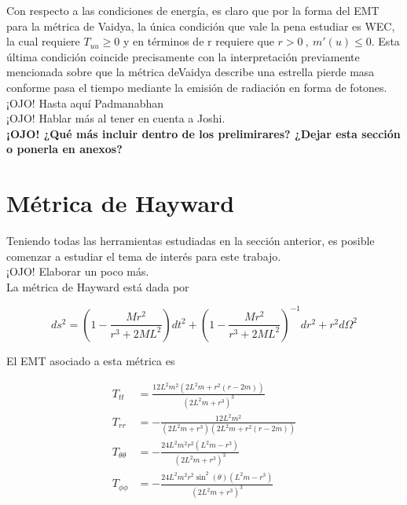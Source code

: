 \documentclass[prb,aps,preprintnumbers,amsmath,amssymb]{article}
\numberwithin{equation}{section}
\begin{document}
Con respecto a las condiciones de energía, es claro que por la forma del EMT para la métrica de Vaidya, la única condición que vale la pena estudiar es WEC, la cual requiere $T_{uu} \geq 0$ y en términos de r requiere que $r > 0\ ,\ m'(u)\leq 0 $. Esta última condición coincide precisamente con la interpretación previamente mencionada sobre que la métrica deVaidya describe una estrella pierde masa conforme pasa el tiempo mediante la emisión de radiación en forma de fotones.\\

¡OJO! Hasta aquí Padmanabhan\\

¡OJO! Hablar más al tener en cuenta a Joshi.\\

\textbf{¡OJO! ¿Qué más incluir dentro de los prelimirares? ¿Dejar esta sección o ponerla en anexos?}\\

\section{Métrica de Hayward}

Teniendo todas las herramientas estudiadas en la sección anterior, es posible comenzar a estudiar el tema de interés para este trabajo.\\

¡OJO! Elaborar un poco más.\\

La métrica de Hayward está dada por 

\begin{equation}
ds^2 = \left( 1 - \frac{Mr^2}{r^3 + 2ML^2} \right) dt^2 + \left( 1 - \frac{Mr^2}{r^3 + 2ML^2} \right)^{-1} dr^2 + r^2d\Omega ^2
\end{equation}

El EMT asociado a esta métrica es

\begin{equation}
\begin{split}
T_{tt} &= \frac{12 L^2 m^2 \left(2 L^2 m+r^2 (r-2 m)\right)}{\left(2 L^2 m+r^3\right)^3}\\
T_{rr} &= -\frac{12 L^2 m^2}{\left(2 L^2 m+r^3\right) \left(2 L^2 m+r^2 (r-2 m)\right)}\\
T_{\theta \theta} &= -\frac{24 L^2 m^2 r^2 \left(L^2 m-r^3\right)}{\left(2 L^2 m+r^3\right)^3}\\
T_{\phi \phi} &= -\frac{24 L^2 m^2 r^2 \sin ^2(\theta ) \left(L^2 m-r^3\right)}{\left(2 L^2 m+r^3\right)^3}
\end{split}
\end{equation}
\end{document}
